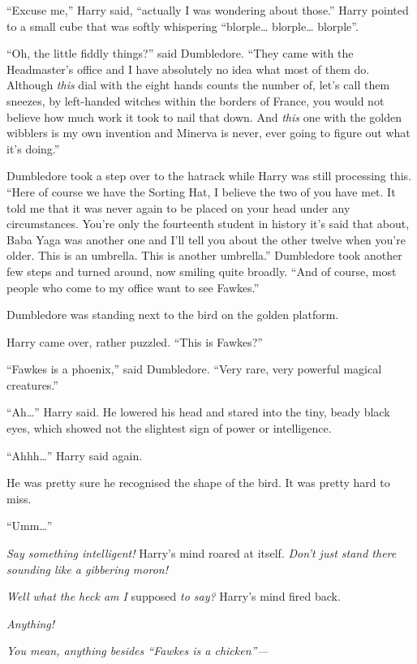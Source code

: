 ``Excuse me,'' Harry said, ``actually I was wondering about those.''
Harry pointed to a small cube that was softly whispering
``blorple\ldots{} blorple\ldots{} blorple''.

``Oh, the little fiddly things?'' said Dumbledore. ``They came with the
Headmaster's office and I have absolutely no idea what most of them do.
Although \emph{this} dial with the eight hands counts the number of,
let's call them sneezes, by left-handed witches within the borders of
France, you would not believe how much work it took to nail that down.
And \emph{this} one with the golden wibblers is my own invention and
Minerva is never, ever going to figure out what it's doing.''

Dumbledore took a step over to the hatrack while Harry was still
processing this. ``Here of course we have the Sorting Hat, I believe the
two of you have met. It told me that it was never again to be placed on
your head under any circumstances. You're only the fourteenth student in
history it's said that about, Baba Yaga was another one and I'll tell
you about the other twelve when you're older. This is an umbrella. This
is another umbrella.'' Dumbledore took another few steps and turned
around, now smiling quite broadly. ``And of course, most people who come
to my office want to see Fawkes.''

Dumbledore was standing next to the bird on the golden platform.

Harry came over, rather puzzled. ``This is Fawkes?''

``Fawkes is a phoenix,'' said Dumbledore. ``Very rare, very powerful
magical creatures.''

``Ah\ldots{}'' Harry said. He lowered his head and stared into the tiny,
beady black eyes, which showed not the slightest sign of power or
intelligence.

``Ahhh\ldots{}'' Harry said again.

He was pretty sure he recognised the shape of the bird. It was pretty
hard to miss.

``Umm\ldots{}''

\emph{Say something intelligent!} Harry's mind roared at itself.
\emph{Don't just stand there sounding like a gibbering moron!}

\emph{Well what the heck am I} supposed \emph{to say?} Harry's mind
fired back.

\emph{Anything!}

\emph{You mean, anything besides ``Fawkes is a chicken''---}

